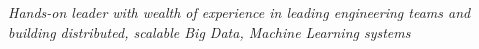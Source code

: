 \begin{cvparagraph}

\vspace{4mm}
\emph{Hands-on leader with wealth of experience in leading engineering teams and building distributed, scalable Big Data, Machine Learning systems}

\end{cvparagraph}
